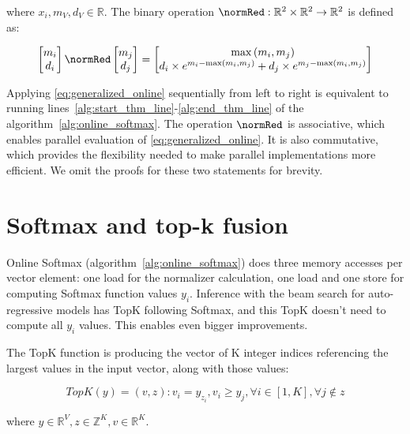 where \(x_i, m_V, d_V \in \mathbb{R}\). The binary operation $\normRed:\mathbb{R}^2\times \mathbb{R}^2\rightarrow\mathbb{R}^2$ is defined as:

\begin{equation}
\begin{bmatrix}m_i\\d_i\end{bmatrix}\normRed\begin{bmatrix}m_j\\d_j\end{bmatrix} = \begin{bmatrix}\max\left(m_i,m_j\right)\\d_i\times e^{m_i-\max\left(m_i,m_j\right)}+d_j\times e^{m_j-\max\left(m_i,m_j\right)}\end{bmatrix}
\end{equation}

Applying \eqref{eq:generalized_online} sequentially from left to right is equivalent to running lines~\ref{alg:start_thm_line}-\ref{alg:end_thm_line} of the algorithm~\ref{alg:online_softmax}. The operation $\normRed$ is associative, which enables parallel evaluation of \eqref{eq:generalized_online}. It is also commutative, which provides the flexibility needed to make parallel implementations more efficient. We omit the proofs for these two statements for brevity.

\section{Softmax and top-k fusion}

Online Softmax (algorithm~\ref{alg:online_softmax}) does three memory accesses per vector element: one load for the normalizer calculation, one load and one store for computing Softmax function values $y_i$. Inference with the beam search for auto-regressive models has TopK following Softmax, and this TopK doesn't need to compute all $y_i$ values. This enables even bigger improvements.

The TopK function is producing the vector of K integer indices referencing the largest values in the input vector, along with those values:

\begin{equation}
TopK\left(y\right)=(v,z): v_i=y_{z_i}, v_i\geq y_j, \forall i \in \left[1,K\right], \forall j \notin z
\end{equation}

where \(y \in \mathbb{R}^V, z \in \mathbb{Z}^K, v\in \mathbb{R}^K\).

